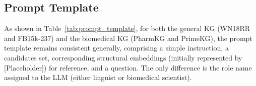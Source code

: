 \documentclass[11pt]{article}
\begin{document}
\subsection{Prompt Template}\label{app:prompt_template}

As shown in Table~\ref{tab:prompt_template}, for both the general KG (WN18RR and FB15k-237) and the biomedical KG (PharmKG and PrimeKG), the prompt template remains consistent generally, comprising a simple instruction, a candidates set, corresponding structural embeddings (initially represented by [Placeholder]) for reference, and a question. The only difference is the role name assigned to the LLM (either linguist or biomedical scientist).

\end{document}
